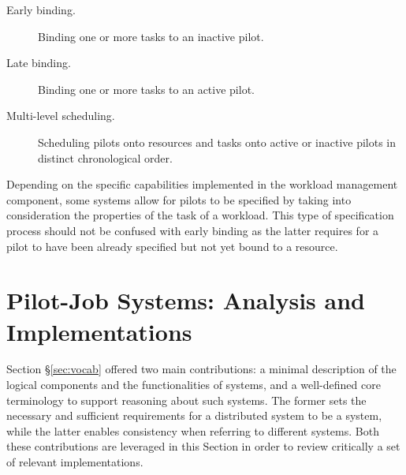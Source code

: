 \documentclass{sig-alternate}
\begin{document}
\begin{description}

\item[Early binding.] Binding one or more tasks to an inactive pilot.

\item[Late binding.] Binding one or more tasks to an active pilot.

\item[Multi-level scheduling.] Scheduling pilots onto resources and tasks onto
active or inactive pilots in distinct chronological order.

\end{description}

Depending on the specific capabilities implemented in the workload management
component, some \pilotjob systems allow for pilots to be specified by taking
into consideration the properties of the task of a workload. This type of
specification process should not be confused with early binding as the latter
requires for a pilot to have been already specified but not yet bound to a
resource.


\section{Pilot-Job Systems: Analysis and Implementations}\label{sec:4}

Section \S\ref{sec:vocab} offered two main contributions: a minimal description
of the logical components and the functionalities of \pilotjob systems, and a
well-defined core terminology to support reasoning about such systems. The
former sets the necessary and sufficient requirements for a distributed system
to be a \pilotjob system, while the latter enables consistency when referring
to different \pilotjob systems. Both these contributions are leveraged in this
Section in order to review critically a set of relevant \pilotjob
implementations.

\end{document}
